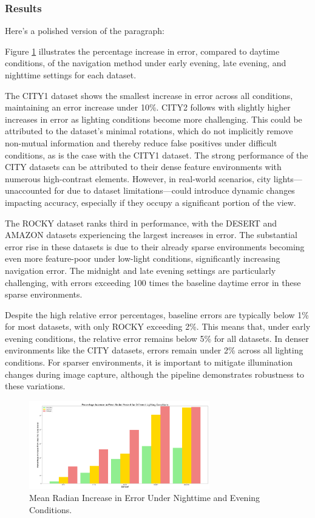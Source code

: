 \subsubsection{Results}


Here's a polished version of the paragraph:

Figure \ref{fig:night_evening_rmse} illustrates the percentage increase in error, compared to daytime conditions, of the navigation method under early evening, late evening, and nighttime settings for each dataset.

The CITY1 dataset shows the smallest increase in error across all conditions, maintaining an error increase under 10\%. CITY2 follows with slightly higher increases in error as lighting conditions become more challenging. This could be attributed to the dataset's minimal rotations, which do not implicitly remove non-mutual information and thereby reduce false positives under difficult conditions, as is the case with the CITY1 dataset. The strong performance of the CITY datasets can be attributed to their dense feature environments with numerous high-contrast elements. However, in real-world scenarios, city lights—unaccounted for due to dataset limitations—could introduce dynamic changes impacting accuracy, especially if they occupy a significant portion of the view.

The ROCKY dataset ranks third in performance, with the DESERT and AMAZON datasets experiencing the largest increases in error. The substantial error rise in these datasets is due to their already sparse environments becoming even more feature-poor under low-light conditions, significantly increasing navigation error. The midnight and late evening settings are particularly challenging, with errors exceeding 100 times the baseline daytime error in these sparse environments.

Despite the high relative error percentages, baseline errors are typically below 1\% for most datasets, with only ROCKY exceeding 2\%. This means that, under early evening conditions, the relative error remains below 5\% for all datasets. In denser environments like the CITY datasets, errors remain under 2\% across all lighting conditions. For sparser environments, it is important to mitigate illumination changes during image capture, although the pipeline demonstrates robustness to these variations.


\begin{figure}[H]
    \centering
    \includegraphics[width=0.7\textwidth]{Chapter 5/RESULTPLOTS/lighting/lightresults.png}
    \caption{Mean Radian Increase in Error Under Nighttime and Evening Conditions.}
    \label{fig:night_evening_rmse}    
\end{figure}


